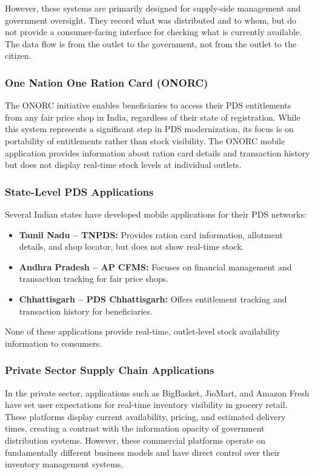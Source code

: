 However, these systems are primarily designed for supply-side management and government oversight. They record what was distributed and to whom, but do not provide a consumer-facing interface for checking what is currently available. The data flow is from the outlet to the government, not from the outlet to the citizen.

\subsubsection{One Nation One Ration Card (ONORC)}

The ONORC initiative enables beneficiaries to access their PDS entitlements from any fair price shop in India, regardless of their state of registration. While this system represents a significant step in PDS modernization, its focus is on portability of entitlements rather than stock visibility. The ONORC mobile application provides information about ration card details and transaction history but does not display real-time stock levels at individual outlets.

\subsubsection{State-Level PDS Applications}

Several Indian states have developed mobile applications for their PDS networks:

\begin{itemize}
    \item \textbf{Tamil Nadu -- TNPDS:} Provides ration card information, allotment details, and shop locator, but does not show real-time stock.
    \item \textbf{Andhra Pradesh -- AP CFMS:} Focuses on financial management and transaction tracking for fair price shops.
    \item \textbf{Chhattisgarh -- PDS Chhattisgarh:} Offers entitlement tracking and transaction history for beneficiaries.
\end{itemize}

None of these applications provide real-time, outlet-level stock availability information to consumers.

\subsubsection{Private Sector Supply Chain Applications}

In the private sector, applications such as BigBasket, JioMart, and Amazon Fresh have set user expectations for real-time inventory visibility in grocery retail. These platforms display current availability, pricing, and estimated delivery times, creating a contrast with the information opacity of government distribution systems. However, these commercial platforms operate on fundamentally different business models and have direct control over their inventory management systems.

